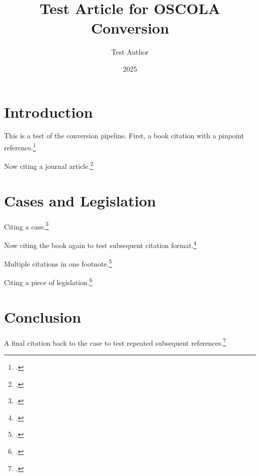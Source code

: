 \documentclass[a4paper,12pt]{article}
\title{Test Article for OSCOLA Conversion}
\author{Test Author}
\date{2025}
\begin{document}
\maketitle

\section{Introduction}

This is a test of the conversion pipeline. First, a book citation
with a pinpoint reference.\footcite[45]{bloggs2025}

Now citing a journal article.\footcite{jones2024}

\section{Cases and Legislation}

Citing a case.\footcite{smith_v_jones}

Now citing the book again to test subsequent citation
format.\footcite[50]{bloggs2025}

Multiple citations in one footnote.\footcites{bloggs2025}{jones2024}

Citing a piece of legislation.\footcite{human_rights_act}

\section{Conclusion}

A final citation back to the case to test repeated subsequent
references.\footcite{smith_v_jones}

\printbibliography
\end{document}
